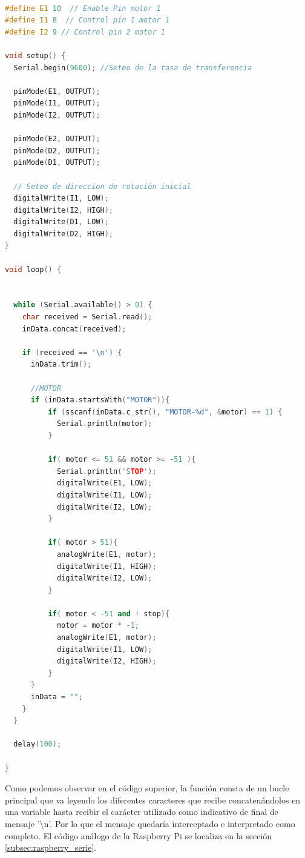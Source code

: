\begin{lstlisting}[language=C++]

#define E1 10  // Enable Pin motor 1
#define I1 8  // Control pin 1 motor 1
#define I2 9 // Control pin 2 motor 1

void setup() {
  Serial.begin(9600); //Seteo de la tasa de transferencia

  pinMode(E1, OUTPUT);
  pinMode(I1, OUTPUT);
  pinMode(I2, OUTPUT);

  pinMode(E2, OUTPUT);
  pinMode(D2, OUTPUT);
  pinMode(D1, OUTPUT);

  // Seteo de direccion de rotación inicial
  digitalWrite(I1, LOW);
  digitalWrite(I2, HIGH);
  digitalWrite(D1, LOW);
  digitalWrite(D2, HIGH);
}

void loop() {


  while (Serial.available() > 0) {
    char received = Serial.read();
    inData.concat(received);

    if (received == '\n') {
      inData.trim();

      //MOTOR
      if (inData.startsWith("MOTOR")){
          if (sscanf(inData.c_str(), "MOTOR-%d", &motor) == 1) {
            Serial.println(motor);
          }

          if( motor <= 51 && motor >= -51 ){
            Serial.println('STOP');
            digitalWrite(E1, LOW);
            digitalWrite(I1, LOW);
            digitalWrite(I2, LOW);
          }

          if( motor > 51){
            analogWrite(E1, motor);
            digitalWrite(I1, HIGH);
            digitalWrite(I2, LOW);
          }

          if( motor < -51 and ! stop){
            motor = motor * -1;
            analogWrite(E1, motor);
            digitalWrite(I1, LOW);
            digitalWrite(I2, HIGH);
          }
      }
      inData = "";
    }
  }
 
  delay(100);

}
\end{lstlisting}


Como podemos observar en el código superior, la función consta de un bucle principal que va leyendo los diferentes caracteres que recibe concatenándolos en una variable hasta recibir 
el carácter utilizado como indicativo de final de mensaje '\textbackslash n'. Por lo que el mensaje quedaría interceptado e interpretado como completo. El código 
análogo de la Raspberry Pi se localiza en la sección \ref{subsec:raspberry_serie}.\\

